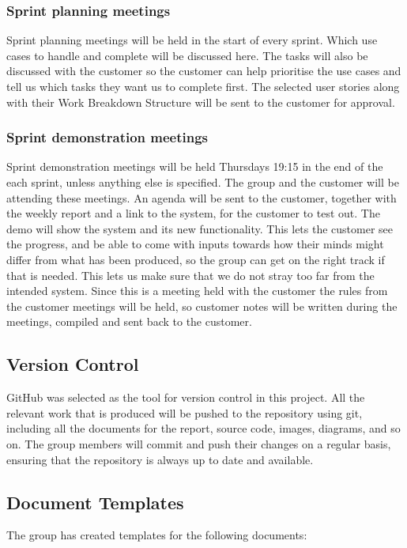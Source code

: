 \subsubsection{Sprint planning meetings}
Sprint planning meetings will be held in the start of every sprint. Which use cases to handle and complete will be discussed here. The tasks will also be discussed with the customer so the customer can help prioritise the use cases and tell us which tasks they want us to complete first. The selected user stories along with their Work Breakdown Structure will be sent to the customer for approval.

\subsubsection{Sprint demonstration meetings}
Sprint demonstration meetings will be held Thursdays 19:15 in the end of the each sprint, unless anything else is specified. The group and the customer will be attending these meetings. An agenda will be sent to the customer, together with the weekly report and a link to the system, for the customer to test out. The demo will show the system and its new functionality. This lets the customer see the progress, and be able to come with inputs towards how their minds might differ from what has been produced, so the group can get on the right track if that is needed. This lets us make sure that we do not stray too far from the intended system. Since this is a meeting held with the customer the rules from the customer meetings will be held, so customer notes will be written during the meetings, compiled and sent back to the customer.

\subsection{Version Control}
GitHub was selected as the tool for version control in this project. All the relevant work that is produced will be pushed to the repository using git, including all the documents for the report, source code, images, diagrams, and so on. The group members will commit and push their changes on a regular basis, ensuring that the repository is always up to date and available.

\subsection{Document Templates}
The group has created templates for the following documents:

